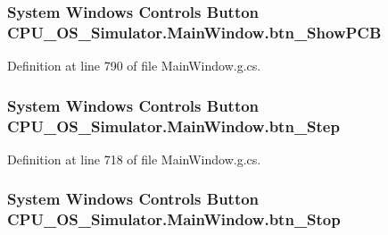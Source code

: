 \subsubsection[{btn\+\_\+\+Show\+P\+C\+B}]{\setlength{\rightskip}{0pt plus 5cm}System Windows Controls Button C\+P\+U\+\_\+\+O\+S\+\_\+\+Simulator.\+Main\+Window.\+btn\+\_\+\+Show\+P\+C\+B\hspace{0.3cm}{\ttfamily [package]}}\label{class_c_p_u___o_s___simulator_1_1_main_window_a967a1b3dbde7ecb1d8091e5eababcc58}


Definition at line 790 of file Main\+Window.\+g.\+cs.

\hypertarget{class_c_p_u___o_s___simulator_1_1_main_window_acd572aa9d278af703febb634fc1c34a3}{}
\subsubsection[{btn\+\_\+\+Step}]{\setlength{\rightskip}{0pt plus 5cm}System Windows Controls Button C\+P\+U\+\_\+\+O\+S\+\_\+\+Simulator.\+Main\+Window.\+btn\+\_\+\+Step\hspace{0.3cm}{\ttfamily [package]}}\label{class_c_p_u___o_s___simulator_1_1_main_window_acd572aa9d278af703febb634fc1c34a3}


Definition at line 718 of file Main\+Window.\+g.\+cs.

\hypertarget{class_c_p_u___o_s___simulator_1_1_main_window_a1b6b541d9765ca230f537d1d6b6c83aa}{}
\subsubsection[{btn\+\_\+\+Stop}]{\setlength{\rightskip}{0pt plus 5cm}System Windows Controls Button C\+P\+U\+\_\+\+O\+S\+\_\+\+Simulator.\+Main\+Window.\+btn\+\_\+\+Stop\hspace{0.3cm}{\ttfamily [package]}}\label{class_c_p_u___o_s___simulator_1_1_main_window_a1b6b541d9765ca230f537d1d6b6c83aa}


